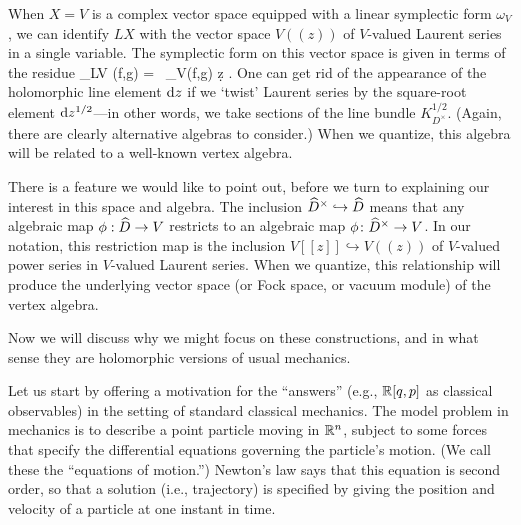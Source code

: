 \documentclass[11pt]{amsart}
\begin{document}
When $X=V$ is a complex vector space equipped with a linear symplectic form $\omega_V$, we can identify $LX$ with the vector space $V((z))$ of $V$-valued Laurent series in a single variable.
The symplectic form on this vector space is given in terms of the residue
\beqn
\omega_{LV} (f,g) =  \, \omega_V(f,g) \d z .
\eeqn
One can get rid of the appearance of the holomorphic line element $\d z$ if we `twist' Laurent series by the square-root element $\d z^{1/2}$---in other words, we take sections of the line bundle $K^{1/2}_{D^\times}$.
(Again, there are clearly alternative algebras to consider.)
When we quantize, this algebra will be related to a well-known vertex algebra.

There is a feature we would like to point out, before we turn to explaining our interest in this space and algebra.
The inclusion $\Hat{D}^\times \hookrightarrow \Hat{D}$ means that any algebraic map  $\phi: \Hat{D} \to V$ restricts to an algebraic map $\phi \colon \Hat{D}^\times \to V$.
In our notation, this restriction map is the inclusion $V[[z]] \hookrightarrow V((z))$ of $V$-valued power series in $V$-valued Laurent series.
When we quantize, this relationship will produce the underlying vector space (or Fock space, or vacuum module) of the vertex algebra.

Now we will discuss why we might focus on these constructions,
and in what sense they are holomorphic versions of usual mechanics.

Let us start by offering a motivation for the ``answers'' (e.g., $\RR[q,p]$ as classical observables) in the setting of standard classical mechanics.
The model problem in mechanics is to describe a point particle moving in $\RR^n$,
subject to some forces that specify the differential equations governing the particle's motion.
(We call these the ``equations of motion.'')
Newton's law says that this equation is second order, so that a solution (i.e., trajectory) is specified by giving the position and velocity of a particle at one instant in time.
\end{document}
